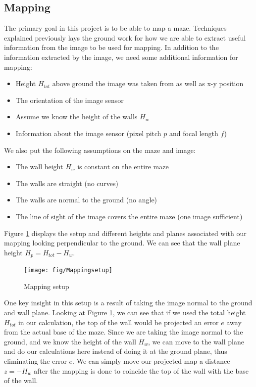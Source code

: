 \subsection{Mapping}
\label{ch:mapping}
The primary goal in this project is to be able to map a maze. Techniques explained previously lays the ground work for how we are able to extract useful information from the image to be used for mapping. In addition to the information extracted by the image, we need some additional information for mapping:
\begin{itemize}
\item Height $H_{tot}$ above ground the image was taken from as well as x-y position
\item The orientation of the image sensor
\item Assume we know the height of the walls $H_w$
\item Information about the image sensor (pixel pitch $p$ and focal length $f$)
\end{itemize}
We also put the following assumptions on the maze and image:
\begin{itemize}
\item The wall height $H_w$ is constant on the entire maze
\item The walls are straight (no curves)
\item The walls are normal to the ground (no angle)
\item The line of sight of the image covers the entire maze (one image sufficient)
\end{itemize}
Figure \ref{fig:mapping} displays the setup and different heights and planes associated with our mapping looking perpendicular to the ground. We can see that the wall plane height $H_p = H_{tot} - H_w$. 
\begin{figure}[H]
\centering
\texttt{[image: fig/Mappingsetup]}
  \caption{Mapping setup}
  \label{fig:mapping}
\end{figure}
One key insight in this setup is a result of taking the image normal to the ground and wall plane. Looking at Figure \ref{fig:mapping}, we can see that if we used the total height $H_{tot}$ in our calculation, the top of the wall would be projected an error $e$ away from the actual base of the maze. Since we are taking the image normal to the ground, and we know the height of the wall $H_w$, we can move to the wall plane and do our calculations here instead of doing it at the ground plane, thus eliminating the error $e$. We can simply move our projected map a distance $z = -H_w$ after the mapping is done to coincide the top of the wall with the base of the wall.

